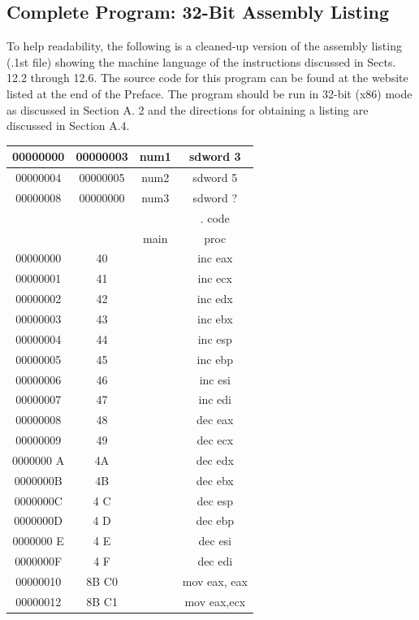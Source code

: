 \documentclass[10pt]{book}
\begin{document}
\subsection{Complete Program: 32-Bit Assembly Listing}
To help readability, the following is a cleaned-up version of the assembly listing (.1st file) showing the machine language of the instructions discussed in Sects. 12.2 through 12.6. The source code for this program can be found at the website listed at the end of the Preface. The program should be run in 32-bit (x86) mode as discussed in Section A. 2 and the directions for obtaining a listing are discussed in Section A.4.


\begin{center}
\begin{tabular}{|c|c|c|c|}
\hline
00000000 & 00000003 & num1 & sdword 3 \\
\hline
00000004 & 00000005 & num2 & sdword 5 \\
\hline
00000008 & 00000000 & num3 & sdword ? \\
\hline
 &  &  & . code \\
\hline
 &  & main & proc \\
\hline
00000000 & 40 &  & inc eax \\
\hline
00000001 & 41 &  & inc ecx \\
\hline
00000002 & 42 &  & inc edx \\
\hline
00000003 & 43 &  & inc ebx \\
\hline
00000004 & 44 &  & inc esp \\
\hline
00000005 & 45 &  & inc ebp \\
\hline
00000006 & 46 &  & inc esi \\
\hline
00000007 & 47 &  & inc edi \\
\hline
00000008 & 48 &  & dec eax \\
\hline
00000009 & 49 &  & dec ecx \\
\hline
0000000 A & 4A &  & dec edx \\
\hline
0000000B & 4B &  & dec ebx \\
\hline
0000000C & 4 C &  & dec esp \\
\hline
0000000D & 4 D &  & dec ebp \\
\hline
0000000 E & 4 E &  & dec esi \\
\hline
0000000F & 4 F &  & dec edi \\
\hline
00000010 & 8B C0 &  & mov eax, eax \\
\hline
00000012 & 8B C1 &  & mov eax,ecx \\

\end{tabular}
\end{center}
\end{document}
